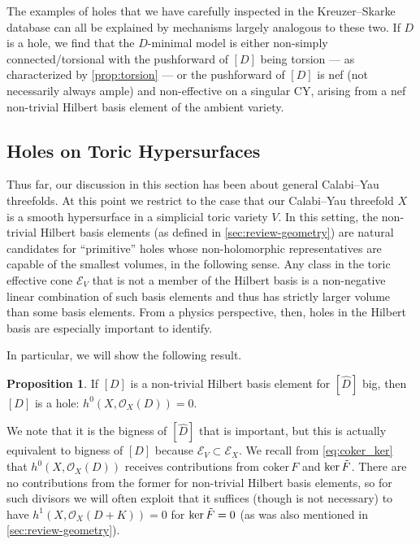 \documentclass[11pt,dvipsnames]{article}
\theoremstyle{definition}
\newtheorem{prop}[theorem]{Proposition}
\begin{document}
The examples of holes that we have carefully inspected in the Kreuzer--Skarke database can all be explained by mechanisms largely analogous to these two. If $D$ is a hole, we find that the $D$-minimal model is either non-simply connected/torsional with the pushforward of $[D]$ being torsion --- as characterized by \cref{prop:torsion} --- or the pushforward of $[D]$ is nef (not necessarily always ample) and non-effective on a singular CY, arising from a nef non-trivial Hilbert basis element of the ambient variety.

\subsection{Holes on Toric Hypersurfaces} \label{sec:toric_hyper_holes}

Thus far, our discussion in this section has been about general Calabi--Yau threefolds. At this point we restrict to the case that our Calabi--Yau threefold $X$ is a smooth hypersurface in a simplicial toric variety $V$. In this setting, the non-trivial Hilbert basis elements (as defined in \cref{sec:review-geometry}) are natural candidates for ``primitive'' holes whose non-holomorphic representatives are capable of the smallest volumes, in the following sense. Any class in the toric effective cone $\mathcal{E}_V$ that is not a member of the Hilbert basis is a non-negative linear combination of such basis elements and thus has strictly larger volume than some basis elements. From a physics perspective, then, holes in the Hilbert basis are especially important to identify. 

In particular, we will show the following result.
\begin{prop}
    If $[D]$ is a non-trivial Hilbert basis element for $[\hat{D}]$ big, then $[D]$ is a hole: $h^0(X, \mathcal{O}_X(D)) = 0$.
    \label{prop:big}
\end{prop}
We note that it is the bigness of $[\hat{D}]$ that is important, but this is actually equivalent to bigness of $[D]$ because $\mathcal{E}_V \subset \mathcal{E}_X$.
We recall from \cref{eq:coker_ker} that $h^0(X,\mathcal{O}_X(D))$ receives contributions from $\mathrm{coker} \, F$ and $\mathrm{ker} \, \Tilde{F}$. There are no contributions from the former for non-trivial Hilbert basis elements, so for such divisors we will often exploit that it suffices (though is not necessary) to have $h^1(X,\mathcal{O}_X(D+K)) = 0$ for $\mathrm{ker} \, \Tilde{F} = 0$ (as was also mentioned in \cref{sec:review-geometry}). 
\end{document}
